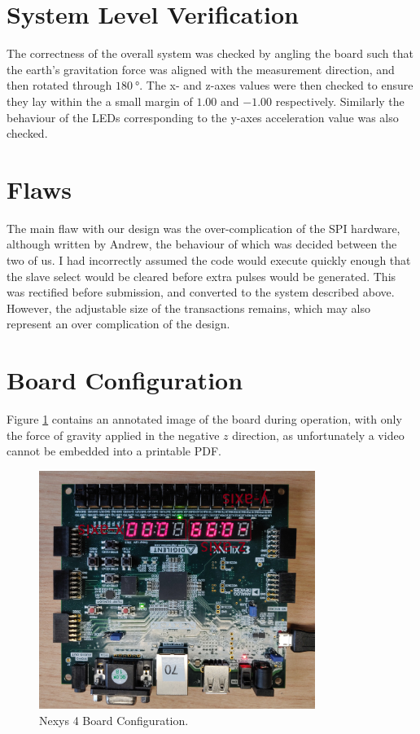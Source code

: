 \documentclass[11pt,british]{report}
\begin{document}
\section*{System Level Verification}
The correctness of the overall system was checked by angling the board such that the earth's gravitation force was aligned with the measurement direction, and then rotated through $180~\si{\degree}$. The x- and z-axes values were then checked to ensure they lay within the a small margin of $1.00$ and $-1.00$ respectively. Similarly the behaviour of the LEDs corresponding to the y-axes acceleration value was also checked.

\section*{Flaws}
The main flaw with our design was the over-complication of the SPI hardware, although written by Andrew, the behaviour of which was decided between the two of us. I had incorrectly assumed the code would execute quickly enough that the slave select would be cleared before extra pulses would be generated. This was rectified before submission, and converted to the system described above. However, the adjustable size of the transactions remains, which may also represent an over complication of the design.

\section*{Board Configuration}
Figure \ref{fig:brd_cfg} contains an annotated image of the board during operation, with only the force of gravity applied in the negative $z$ direction, as unfortunately a video cannot be embedded into a printable PDF.
\begin{figure}[h]
	\centering
	\includegraphics[width=0.8\textwidth]{annotated}
	\caption{Nexys 4 Board Configuration.}
	\label{fig:brd_cfg}
\end{figure}
\end{document}

